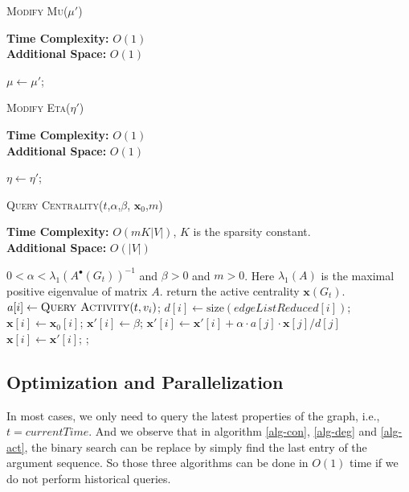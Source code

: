 \documentclass[12pt,abstract=true]{scrartcl}
\numberwithin{equation}{section}
\theoremstyle{definition}   \newtheorem{definition}{Definition}[section]
\theoremstyle{plain}        \newtheorem{theorem}{Theorem}[section]
\theoremstyle{plain}        \newtheorem{observation}{Observation}[section]
\theoremstyle{plain}        \newtheorem{fact}{Fact}[section]
\theoremstyle{plain}        \newtheorem{claim}{Claim}[section]
\theoremstyle{plain}        \newtheorem{lemma}[theorem]{Lemma}
\theoremstyle{plain}        \newtheorem{corollary}[theorem]{Corollary}
\theoremstyle{remark}       \newtheorem{example}{Example}[section]
\theoremstyle{remark}       \newtheorem{remark}{Remark}[section]
\begin{document}
\begin{algorithm}[htbp]
\caption{\textsc{Modify Mu}($\mu'$)}
\label{alg-mu}
\textbf{Time Complexity:} $O(1)$\\
\textbf{Additional Space:} $O(1)$
\begin{algorithmic}[1]
\State $\mu\gets\mu'$;
\end{algorithmic}
\end{algorithm}

\begin{algorithm}[htbp]
\caption{\textsc{Modify Eta}($\eta'$)}
\label{alg-eta}
\textbf{Time Complexity:} $O(1)$\\
\textbf{Additional Space:} $O(1)$
\begin{algorithmic}[1]
\State $\eta\gets\eta'$;\State{}
\end{algorithmic}
\end{algorithm}


\begin{algorithm}[htbp]
\caption{\textsc{Query Centrality}($t$,$\alpha$,$\beta$,
$\mathbf{x}_0$,$m$)}
\label{alg-cen}
\textbf{Time Complexity:} $O(mK|V|)$, $K$ is the sparsity constant.\\
\textbf{Additional Space:} $O(|V|)$
\begin{algorithmic}[1]
\Require $0<\alpha<\lambda_1(A^\bullet(G_t))^{-1}$ and $\beta>0$ and $m>0$. Here
$\lambda_1(A)$ is the maximal positive eigenvalue of matrix $A$.
\Ensure return the active centrality $\mathbf{x}(G_t)$.
\State $a[i]\gets \Call{Query Activity}{t,v_i}$;
\State $d[i]\gets \mathrm{size}(\mathit{edgeListReduced}[i])$;
\State $\mathbf{x}[i]\gets \mathbf{x}_0[i]$;
\EndFor
{}
\State $\mathbf{x'}[i]\gets \beta$;
\EndFor
{}
\State $\mathbf{x'}[i]\gets \mathbf{x'}[i]+\alpha\cdot
a[j]\cdot\mathbf{x}[j]/d[j]$
\EndFor\EndFor
{}
\State $\mathbf{x}[i]\gets \mathbf{x'}[i]$;
\EndFor
\EndFor
\State{};
\end{algorithmic}
\end{algorithm}

\subsection{Optimization and Parallelization}
In most cases, we only need to query the latest properties of the graph, i.e.,
$t=\mathit{currentTime}$. And we observe that in algorithm \ref{alg-con},
\ref{alg-deg} and \ref{alg-act}, the binary search can be replace by simply find
the last entry of the argument sequence. So those three algorithms can be done
in $O(1)$ time if we do not perform historical queries.
\end{document}
